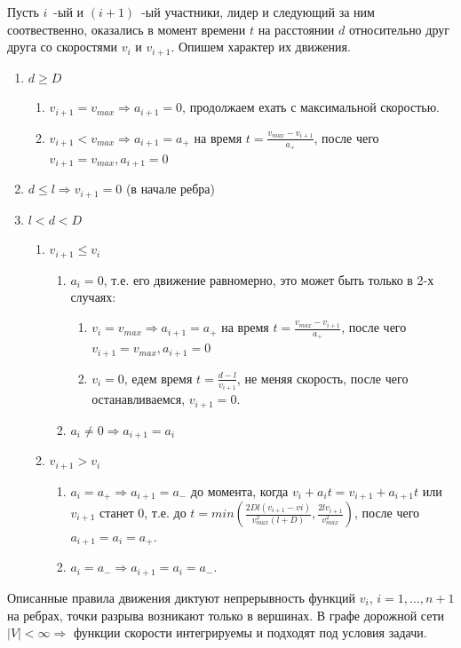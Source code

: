 \documentclass[12pt, a4paper]{article}
\begin{document}
Пусть $i$~-ый и $(i+1)$~-ый участники, лидер и следующий за ним соотвественно, оказались в момент времени $t$ на расстоянии $d$ относительно друг друга со скоростями $v_i$ и $v_{i+1}$. Опишем характер их движения.
\begin{enumerate}
	\item $d \ge D $
	\begin{enumerate}
		\item $v_{i+1} = v_{max} \Rightarrow a_{i+1} = 0$, продолжаем ехать с максимальной скоростью.
		\item $v_{i+1} < v_{max} \Rightarrow a_{i+1} = a_+$ на время $t = \frac{v_{max}-v_{i+1}}{a_+}$, после чего $v_{i+1} = v_{max}, a_{i+1} = 0$
	\end{enumerate}	
	\item $d \leq l \Rightarrow v_{i+1} = 0$ (в начале ребра)
	\item $l < d < D $
	\begin{enumerate}
	\item $v_{i+1} \leq v_i$
		\begin{enumerate}
			\item $a_i = 0$, т.е. его движение равномерно, это может быть только в 2-х случаях:
			\begin{enumerate}
				\item $v_i = v_{max} \Rightarrow a_{i+1} = a_+$ на время $t = \frac{v_{max}-v_{i+1}}{a_+}$, после чего $v_{i+1} = v_{max}, a_{i+1} = 0$
				\item $v_i = 0$, едем время $t = \frac{d-l}{v_{i+1}}$, не меняя скорость, после чего останавливаемся, $v_{i+1} = 0$.
			\end{enumerate}	
			\item $a_i \neq 0 \Rightarrow a_{i+1} = a_i$ 
		\end{enumerate}
	\item $v_{i+1} > v_i$ 
	\begin{enumerate}
		\item $a_i = a_+ \Rightarrow a_{i+1} = a_-$ до момента, когда $v_i + a_it = v_{i+1} + a_{i+1}t$ или $v_{i+1}$ станет $0$, т.е. до $t = min\left(\frac{2Dl(v_{i+1}-vi)}{v^2_{max}(l+D)}, \frac{2lv_{i+1}}{v^2_{max}}\right)$,  после чего $a_{i+1} = a_i = a_+$. 
		\item $a_i = a_- \Rightarrow a_{i+1} = a_i = a_-$.
	\end{enumerate}	
	\end{enumerate}
\end{enumerate}

Описанные правила движения диктуют непрерывность функций $v_i$, $i = 1, \dots, n+1$ на ребрах, точки разрыва возникают только в вершинах. В графе дорожной сети $|V| < \infty \Rightarrow $ функции скорости интегрируемы и подходят под условия задачи.
\end{document}
